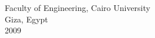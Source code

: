 \documentclass[11pt,doublespace]{SketchThesis}
\begin{document}
 \begin{center}
   Faculty of Engineering, Cairo University \\ Giza, Egypt \\  2009
\end{center}

\end{document}
